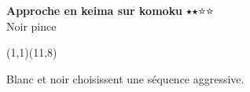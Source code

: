 \documentclass[preview, border=0pt, varwidth=false]{standalone}
\begin{document}
	\setgounit{0.6cm} 
	
\parbox[c][14.65cm][c]{10.2cm}{
	\centering
	
	{\Large\textbf{Approche en keima sur komoku} 	$\medblackstar \medblackstar \medwhitestar \medwhitestar$ \\ Noir pince}
	\vspace{3em}
	
	\begin{psgopartialboard}{(1,1)(11,8)}
		\pass
	\end{psgopartialboard}
	
	\vspace{1em}
	Blanc et noir choisissent une séquence aggressive.
	}
\end{document}
